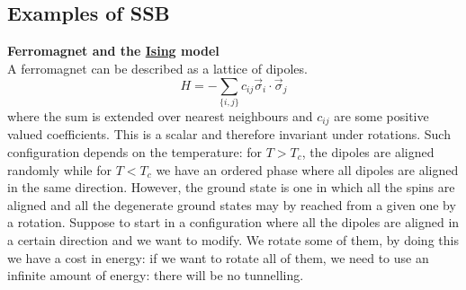 \documentclass[../main.tex]{subfiles}
\begin{document}
\subsection{Examples of SSB}
\begin{example}
\textbf{Ferromagnet and the \href{https://en.wikipedia.org/wiki/Ernst_Ising}{Ising} model}\\
A ferromagnet can be described as a lattice of dipoles.
\[
H=-\sum_{\{i,j\}}c_{ij}\Vec{\sigma}_i\cdot\Vec{\sigma}_j
\]
where the sum is extended over nearest neighbours and $c_{ij}$ are some positive valued coefficients. This is a scalar and therefore invariant under rotations. Such configuration depends on the temperature: for $T>T_c$, the dipoles are aligned randomly while for $T<T_c$ we have an ordered phase where all dipoles are aligned in the same direction. However, the ground state is one in which all the spins are aligned and all the degenerate ground states may by reached from a given one by a rotation. Suppose to start in a configuration where all the dipoles are aligned in a certain direction and we want to modify. We rotate some of them, by doing this we have a cost in energy: if we want to rotate all of them, we need to use an infinite amount of energy: there will be no tunnelling.
\end{example}
\end{document}
